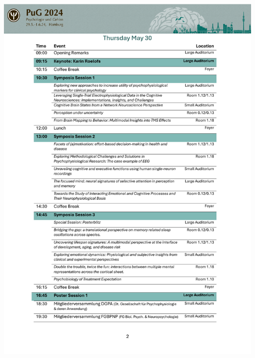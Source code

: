     \begin{center}
		\includegraphics[width=1\textwidth]{tex/images/programme_overview/Thu.pdf}
	\end{center}
		
	\newpage

